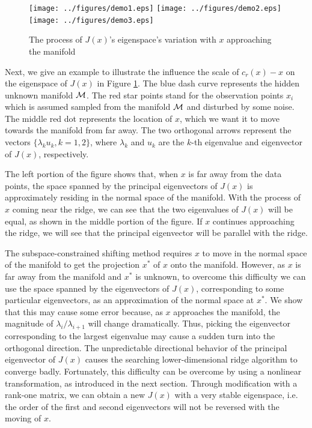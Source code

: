 \documentclass[aos,preprint]{imsart}
\theoremstyle{remark}
\begin{document}
\begin{figure} %
\texttt{[image: ../figures/demo1.eps]} 
\hspace{-4mm}\texttt{[image: ../figures/demo2.eps]} 
\hspace{-4mm}\texttt{[image: ../figures/demo3.eps]} 
\caption{The process of $J(x)$'s eigenspace's variation with $x$ approaching the manifold }
\label{Shifting Eigenvectors}
\end{figure}

Next, we give an example to illustrate the influence the scale of $c_r(x)-x$ on the eigenspace of $J(x)$ in Figure \ref{Shifting Eigenvectors}. The blue dash curve represents the hidden unknown manifold $\cal M$. The red star points stand for the observation points $x_i$ which is assumed sampled from the manifold $\cal M$ and disturbed by some noise. The middle red dot represents the location of $x$, which we want it to move towards the manifold from far away. The two orthogonal arrows represent the vectors $\{\lambda_k u_k, k=1,2\}$, where $\lambda_k$ and $u_k$ are the $k$-th eigenvalue and eigenvector of $J(x)$, respectively.

The left portion of the figure shows that, when $x$ is far away from the data points, the space spanned by the principal eigenvectors of $J(x)$ is approximately residing in the normal space of the manifold. With the process of $x$ coming near the ridge, we can see that the two eigenvalues of $J(x)$ will be equal, as shown in the middle portion of the figure. If $x$ continues approaching the ridge, we will see that the principal eigenvector will be parallel with the ridge.

The subspace-constrained shifting method requires $x$ to move in the normal space of the manifold to get the projection $x^*$ of $x$ onto the manifold. However, as $x$ is far away from the manifold and $x^*$ is unknown, to overcome this difficulty we can use the space spanned by the eigenvectors of $J(x)$, corresponding to some particular eigenvectors, as an approximation of the normal space at $x^*$. We show that this may cause some error because, as $x$ approaches the manifold, the magnitude of $\lambda_i/\lambda_{i+1}$ will change dramatically. Thus, picking the eigenvector corresponding to the largest eigenvalue may cause a sudden turn into the orthogonal direction. The unpredictable directional behavior of the principal eigenvector of $J(x)$ causes the searching lower-dimensional ridge algorithm to converge badly. Fortunately, this difficulty can be overcome by using a nonlinear transformation, as introduced in the next section. Through modification with a rank-one matrix, we can obtain a new $J(x)$ with a very stable eigenspace, i.e. the order of the first and second eigenvectors will not be reversed with the moving of $x$. %
\end{document}
